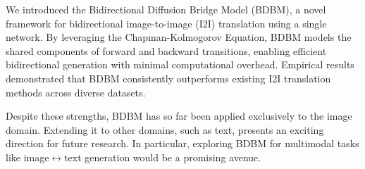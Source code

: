 We introduced the Bidirectional Diffusion Bridge Model (BDBM), a novel
framework for bidirectional image-to-image (I2I) translation using
a single network. By leveraging the Chapman-Kolmogorov Equation, BDBM
models the shared components of forward and backward transitions,
enabling efficient bidirectional generation with minimal computational
overhead. Empirical results demonstrated that BDBM consistently outperforms
existing I2I translation methods across diverse datasets.

Despite these strengths, BDBM has so far been applied exclusively
to the image domain. Extending it to other domains, such as text,
presents an exciting direction for future research. In particular,
exploring BDBM for multimodal tasks like image$\leftrightarrow$text
generation would be a promising avenue.


